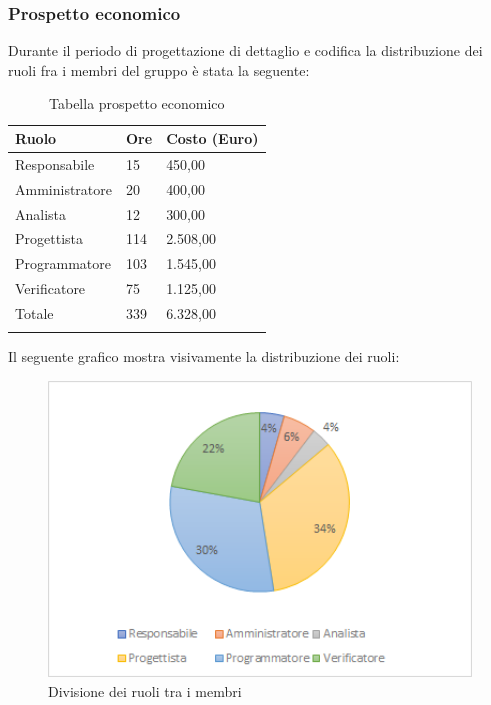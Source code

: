 \subsubsection{Prospetto economico}
Durante il periodo di progettazione di dettaglio e codifica la distribuzione dei ruoli fra i membri del gruppo è stata la seguente:
\begin{center}
	\renewcommand{\arraystretch}{1.5}
	\begin{longtable}[H]{  p{5.6cm}  p{3cm} p{3cm}  }
		\rowcolor{tableHeadYellow}
		\textbf{Ruolo}   & \textbf{Ore} & \textbf{Costo (Euro)} \\ 
		\endhead
		Responsabile   & 15   & 450,00 \\
		Amministratore & 20   & 400,00 \\
		Analista       & 12   & 300,00 \\
		Progettista    & 114  & 2.508,00 \\
		Programmatore  & 103  & 1.545,00 \\
		Verificatore   & 75   & 1.125,00 \\
		Totale         & 339  & 6.328,00 \\
		\rowcolor{white}
		\caption{Tabella prospetto economico}
	\end{longtable}
\end{center}
Il seguente grafico mostra visivamente la distribuzione dei ruoli:
\begin{figure}[H]
	\centering
	\includegraphics[width=15cm,keepaspectratio]{../includes/pics/grafici/grafico8.png}
	\caption{\label{fig:mission}Divisione dei ruoli tra i membri}
\end{figure}
\clearpage
